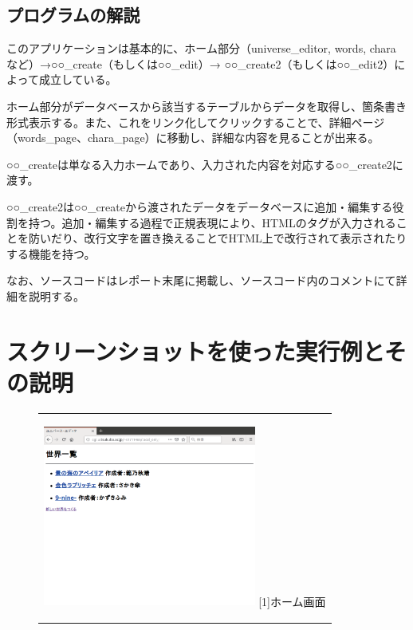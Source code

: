 \documentclass[12pt,a4paper]{jarticle}
\begin{document}
\begin{ttfamily}
\subsection{プログラムの解説}
このアプリケーションは基本的に、ホーム部分（universe\_editor, words, chara など）→○○\_create（もしくは○○\_edit）→ ○○\_create2（もしくは○○\_edit2）によって成立している。
\par ホーム部分がデータベースから該当するテーブルからデータを取得し、箇条書き形式表示する。また、これをリンク化してクリックすることで、詳細ページ（words\_page、chara\_page）に移動し、詳細な内容を見ることが出来る。
\par ○○\_createは単なる入力ホームであり、入力された内容を対応する○○\_create2に渡す。
\par ○○\_create2は○○\_createから渡されたデータをデータベースに追加・編集する役割を持つ。追加・編集する過程で正規表現により、HTMLのタグが入力されることを防いだり、改行文字を置き換えることでHTML上で改行されて表示されたりする機能を持つ。
\par なお、ソースコードはレポート末尾に掲載し、ソースコード内のコメントにて詳細を説明する。

\newpage
\section{スクリーンショットを使った実行例とその説明}
\begin{figure}[htbp]
  \begin{center}
    \begin{tabular}{c}

      \begin{minipage}{0.53\hsize}
        \begin{center}
          \includegraphics[width=7.0cm]{10-3-1.eps}
          \hspace{1.6cm} [1]ホーム画面
        \end{center}
      \end{minipage}


\end{tabular}
\end{center}
\end{figure}
\end{ttfamily}
\end{document}

